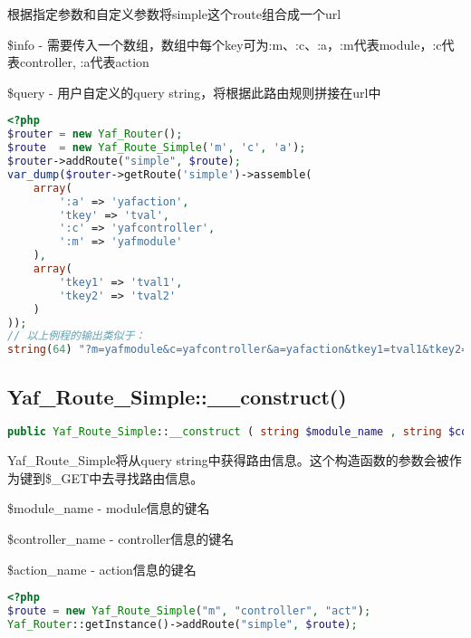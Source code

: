 根据指定参数和自定义参数将simple这个route组合成一个url

\begin{compactitem}
\item \$info - 需要传入一个数组，数组中每个key可为:m、:c、:a，:m代表module，:c代表controller, :a代表action

\item \$query - 用户自定义的query string，将根据此路由规则拼接在url中

\end{compactitem}



\begin{lstlisting}[language=PHP]
<?php
$router = new Yaf_Router();
$route  = new Yaf_Route_Simple('m', 'c', 'a');
$router->addRoute("simple", $route);
var_dump($router->getRoute('simple')->assemble(
    array(
        ':a' => 'yafaction',
        'tkey' => 'tval',
        ':c' => 'yafcontroller',
        ':m' => 'yafmodule'
    ),
    array(
        'tkey1' => 'tval1',
        'tkey2' => 'tval2'
    )
));
// 以上例程的输出类似于：
string(64) "?m=yafmodule&c=yafcontroller&a=yafaction&tkey1=tval1&tkey2=tval2"
\end{lstlisting}

\subsection{Yaf\_Route\_Simple::\_\_construct()}




\begin{lstlisting}[language=PHP]
public Yaf_Route_Simple::__construct ( string $module_name , string $controller_name , string $action_name )
\end{lstlisting}

Yaf\_Route\_Simple将从query string中获得路由信息。这个构造函数的参数会被作为键到\$\_GET中去寻找路由信息。

\begin{compactitem}
\item \$module\_name - module信息的键名
\item \$controller\_name - controller信息的键名
\item \$action\_name - action信息的键名
\end{compactitem}




\begin{lstlisting}[language=PHP]
<?php
$route = new Yaf_Route_Simple("m", "controller", "act");
Yaf_Router::getInstance()->addRoute("simple", $route);
\end{lstlisting}

